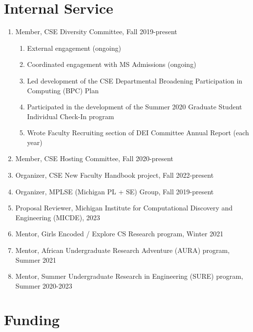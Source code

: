\documentclass[10pt,letterpaper]{article}
\begin{document}
\section*{Internal Service}
\begin{enumerate}
  \item Member, CSE Diversity Committee, Fall 2019-present
        \begin{enumerate}
          \item External engagement (ongoing)
          \item Coordinated engagement with MS Admissions (ongoing)
          \item Led development of the CSE Departmental Broadening Participation in Computing (BPC) Plan
          \item Participated in the development of the Summer 2020 Graduate Student Individual Check-In program
          \item Wrote Faculty Recruiting section of DEI Committee Annual Report (each year)
        \end{enumerate}
  \item Member, CSE Hosting Committee, Fall 2020-present
  \item Organizer, CSE New Faculty Handbook project, Fall 2022-present
  \item Organizer, MPLSE (Michigan PL + SE) Group, Fall 2019-present
  \item Proposal Reviewer, Michigan Institute for Computational Discovery and Engineering (MICDE), 2023
  \item Mentor, Girls Encoded / Explore CS Research program, Winter 2021
  \item Mentor, African Undergraduate Research Adventure (AURA) program, Summer 2021
  \item Mentor, Summer Undergraduate Research in Engineering (SURE) program, Summer 2020-2023
\end{enumerate}


\section*{Funding}
\end{document}
